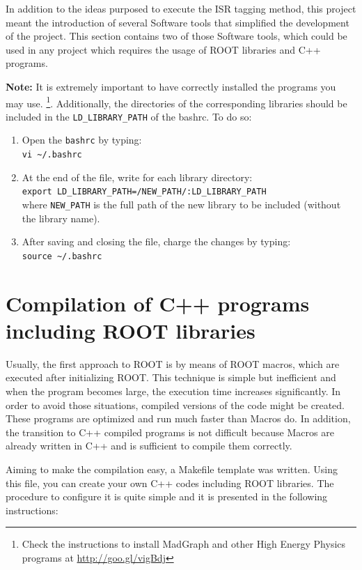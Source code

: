 \documentclass[12pt, oneside]{book}              %
\begin{document}
In addition to the ideas purposed to execute the ISR tagging method,
this project meant the introduction of several Software tools that
simplified the development of the project. This section contains
two of those Software tools, which could be used in any project which
requires the usage of ROOT libraries and C++ programs. 

\textbf{Note:} It is extremely important to have correctly installed
 the programs you may use. \footnote{Check the instructions to 
 	install MadGraph and other High Energy Physics programs at
 	\url{http://goo.gl/vigBdj}}. 
 Additionally, the directories of the corresponding libraries should
 be included in the \texttt{LD\_LIBRARY\_PATH} of the bashrc. To do so:
 
 \begin{enumerate}
 	\item Open the \texttt{bashrc} by typing:
	 	\\ \texttt{vi \~{}/.bashrc}
	\item At the end of the file, write for each library directory:
		\\ \texttt{export LD\_LIBRARY\_PATH=/NEW\_PATH/:LD\_LIBRARY\_PATH }
		\\ where \texttt{NEW\_PATH} is the full path of the new library
		to be included (without the library name).
	\item After saving and closing the file, charge the changes by typing:
		\\ \texttt{source \~{}/.bashrc}
 \end{enumerate}

\section[C++ and ROOT Makefile]{Compilation of C++ programs including ROOT libraries} \label{sec:Root_makefile}

Usually, the first approach to ROOT is by means of ROOT macros, which 
are executed after initializing ROOT. This technique is simple but
inefficient and when the program becomes large, the execution time
increases significantly. In order to avoid those situations, compiled
versions of the code might be created. These programs are optimized and
run much faster than Macros do. In addition, the transition to C++ 
compiled programs is not difficult because Macros are already written
in C++ and is sufficient to compile them correctly. 

Aiming to make the compilation easy, a Makefile template was written.
Using this file, you can create your own C++ codes including ROOT 
libraries. The procedure to configure it is quite simple and it is
presented in the following instructions:
\end{document}
